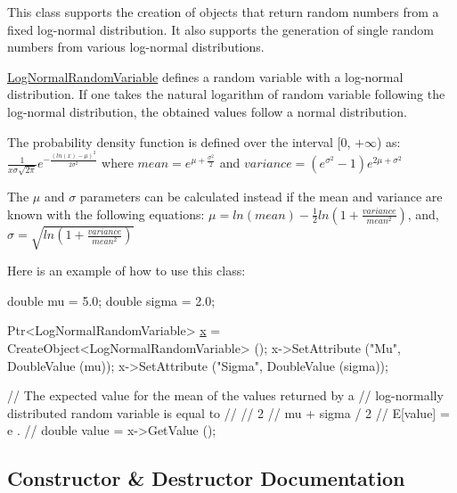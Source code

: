 This class supports the creation of objects that return random numbers from a fixed log-\/normal distribution. It also supports the generation of single random numbers from various log-\/normal distributions.

\hyperlink{classns3_1_1LogNormalRandomVariable}{Log\+Normal\+Random\+Variable} defines a random variable with a log-\/normal distribution. If one takes the natural logarithm of random variable following the log-\/normal distribution, the obtained values follow a normal distribution.

The probability density function is defined over the interval \mbox{[}0, $+\infty$) as\+: $ \frac{1}{x\sigma\sqrt{2\pi}} e^{-\frac{(ln(x) - \mu)^2}{2\sigma^2}}$ where $ mean = e^{\mu+\frac{\sigma^2}{2}} $ and $ variance = (e^{\sigma^2}-1)e^{2\mu+\sigma^2}$

The $ \mu $ and $ \sigma $ parameters can be calculated instead if the mean and variance are known with the following equations\+: $ \mu = ln(mean) - \frac{1}{2}ln\left(1+\frac{variance}{mean^2}\right)$, and, $ \sigma = \sqrt{ln\left(1+\frac{variance}{mean^2}\right)}$

Here is an example of how to use this class\+: 
\begin{DoxyCode}
\textcolor{keywordtype}{double} mu = 5.0;
\textcolor{keywordtype}{double} sigma = 2.0;

Ptr<LogNormalRandomVariable> \hyperlink{lte__link__budget__x2__handover__measures_8m_a9336ebf25087d91c818ee6e9ec29f8c1}{x} = CreateObject<LogNormalRandomVariable> ();
x->SetAttribute (\textcolor{stringliteral}{"Mu"}, DoubleValue (mu));
x->SetAttribute (\textcolor{stringliteral}{"Sigma"}, DoubleValue (sigma));

\textcolor{comment}{// The expected value for the mean of the values returned by a}
\textcolor{comment}{// log-normally distributed random variable is equal to }
\textcolor{comment}{//}
\textcolor{comment}{//                             2}
\textcolor{comment}{//                   mu + sigma  / 2}
\textcolor{comment}{//     E[value]  =  e                 .}
\textcolor{comment}{//}
\textcolor{keywordtype}{double} value = x->GetValue ();
\end{DoxyCode}
 

\subsection{Constructor \& Destructor Documentation}

